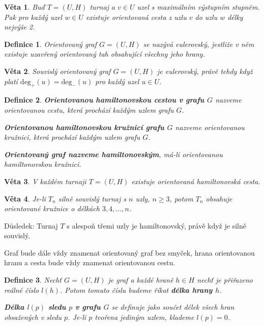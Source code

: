 \documentclass[a4paper, 11pt]{report}
\newtheorem{mydef}{Definice}[chapter]
\newtheorem{veta}{Věta}[chapter]
\begin{document}
\begin{veta}
Buď $T = (U, H)$ turnaj a $v \in U$ uzel s maximálním výstupním stupněm. Pak pro každý uzel $w \in U$ existuje orientovaná cesta z uzlu $v$ do uzlu $w$ délky nejvýše 2.
\end{veta}

\begin{mydef}
Orientovaný graf $G=(U, H)$ se nazývá eulerovský, jestliže v něm existuje uzavřený orientovaný tah obsahující všechny jeho hrany.
\end{mydef}

\begin{veta}
Souvislý orientovaný graf $G=(U, H)$ je eulerovský, právě tehdy když platí $\text{deg}_+(u) = \text{deg}_-(u)$ pro každý uzel $u \in U$.
\end{veta}

\begin{mydef}
\textbf{Orientovanou hamiltonovskou cestou v grafu $G$} nazveme orientovanou cestu, která prochází každým uzlem grafu $G$.

\textbf{Orientovanou hamiltonovskou kružnicí grafu $G$} nazveme orientovanou kružnici, která prochází každým uzlem grafu $G$.

\textbf{Orientovaný graf nazveme hamiltonovským}, má-li orientovanou hamiltonovskou kružnici.
\end{mydef}

\begin{veta}
V každém turnaji $T=(U, H)$ existuje orientovaná hamiltonovská cesta.
\end{veta}

\begin{veta}
Je-li $T_n$ silně souvislý turnaj s $n$ uzly, $n \geq 3$, potom $T_n$ obsahuje orientované kružnice o délkách $3, 4, \dots, n$.
\end{veta}

Důsledek: Turnaj $T$ s alespoň třemi uzly je hamiltonovský, právě když je silně souvislý.

Graf bude dále vždy znamenat orientovaný graf bez smyček, hrana orientovanou hranu a cesta bude vždy znamenat orientovanou cestu.
\begin{mydef}
Nechť $G=(U, H)$ je graf a každé hraně $h \in H$ nechť je přiřazeno reálné číslo $l(h)$. Potom tomuto číslu budeme říkat \textbf{délka hrany $h$}.

\textbf{Délka $l(p)$ sledu $p$ v grafu $G$} se definuje jako součet délek všech hran obsažených v sledu $p$. Je-li $p$ tvořena jediným uzlem, klademe $l(p) = 0$.
\end{mydef}
\end{document}
